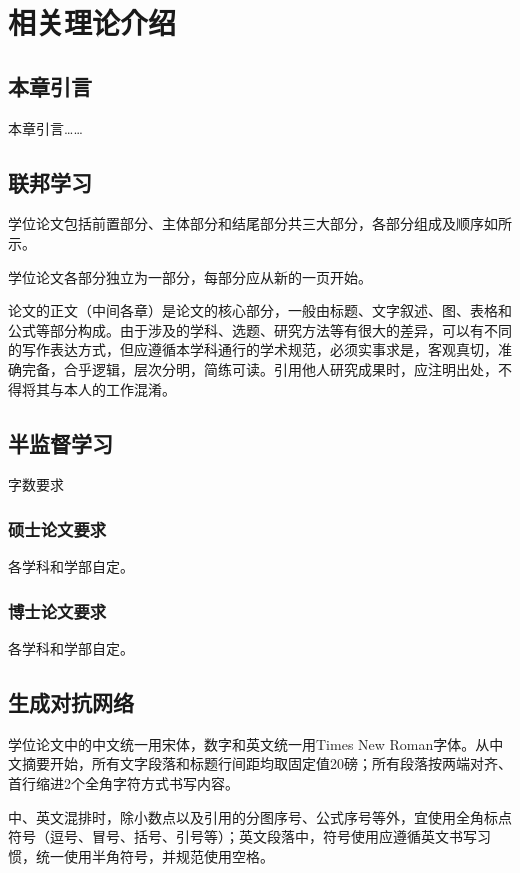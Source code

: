 


\chapter{相关理论介绍}
\thispagestyle{others}
\pagestyle{others}
\xiaosi

\section{本章引言}

本章引言……

\section{联邦学习}

学位论文包括前置部分、主体部分和结尾部分共三大部分，各部分组成及顺序如所示。

学位论文各部分独立为一部分，每部分应从新的一页开始。

论文的正文（中间各章）是论文的核心部分，一般由标题、文字叙述、图、表格和公式等部分构成。由于涉及的学科、选题、研究方法等有很大的差异，可以有不同的写作表达方式，但应遵循本学科通行的学术规范，必须实事求是，客观真切，准确完备，合乎逻辑，层次分明，简练可读。引用他人研究成果时，应注明出处，不得将其与本人的工作混淆。


\section{半监督学习}
字数要求


\subsection{硕士论文要求}

各学科和学部自定。

\subsection{博士论文要求}

各学科和学部自定。

\section{生成对抗网络}
学位论文中的中文统一用宋体，数字和英文统一用Times New Roman字体。从中文摘要开始，所有文字段落和标题行间距均取固定值20磅；所有段落按两端对齐、首行缩进2个全角字符方式书写内容。

中、英文混排时，除小数点以及引用的分图序号、公式序号等外，宜使用全角标点符号（逗号、冒号、括号、引号等）；英文段落中，符号使用应遵循英文书写习惯，统一使用半角符号，并规范使用空格。

